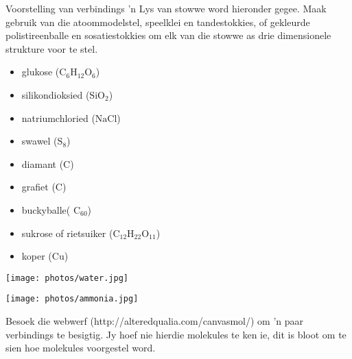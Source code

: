 \begin{activity}{Voorstelling van verbindings}
 'n Lys van stowwe word hieronder gegee. Maak gebruik van die atoommodelstel, speelklei en tandestokkies, of gekleurde polistireenballe en sosatiestokkies om elk van die stowwe as drie dimensionele strukture voor te stel.\\
\begin{minipage}{.4\textwidth}
\begin{itemize}[noitemsep]
 \item glukose ($\text{C}_{6}\text{H}_{12}\text{O}_{6}$)
\item silikondioksied ($\text{SiO}_{2}$)
\item natriumchloried ($\text{NaCl}$)
\item swawel ($\text{S}_{8}$)
\item diamant ($\text{C}$)
\item grafiet ($\text{C}$)
\item buckyballe( $\text{C}_{60}$)
\item sukrose of rietsuiker ($\text{C}_{12}\text{H}_{22}\text{O}_{11}$)
\item koper ($\text{Cu}$)
\end{itemize}
\end{minipage}
\begin{minipage}{.6\textwidth}
\begin{center}
\texttt{[image: photos/water.jpg]}
\end{center}  
\begin{center}
\texttt{[image: photos/ammonia.jpg]}
\end{center}
\end{minipage}
\end{activity}
\label{m38120*uid8310432}Besoek die webwerf (http://alteredqualia.com/canvasmol/) om 'n paar verbindings te besigtig. Jy
hoef nie hierdie molekules te ken ie, dit is bloot om te sien hoe molekules voorgestel word. 


